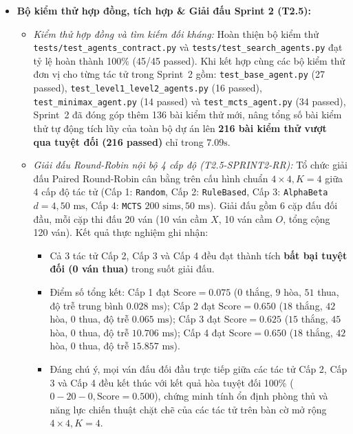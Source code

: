 \documentclass[a4paper,12pt]{report}
\begin{document}
\begin{itemize}
\begin{itemize}
    \end{itemize}
    \item \textbf{Bộ kiểm thử hợp đồng, tích hợp \& Giải đấu Sprint 2 (T2.5):}
    \begin{itemize}
        \item \textit{Kiểm thử hợp đồng và tìm kiếm đối kháng:} Hoàn thiện bộ kiểm thử \texttt{tests/\allowbreak test\_\allowbreak agents\_\allowbreak contract.py} và \texttt{tests/\allowbreak test\_\allowbreak search\_\allowbreak agents.py} đạt tỷ lệ hoàn thành 100\% (45/45 passed). Khi kết hợp cùng các bộ kiểm thử đơn vị cho từng tác tử trong Sprint~2 gồm: \texttt{test\_\allowbreak base\_\allowbreak agent.py} (27 passed), \texttt{test\_\allowbreak level1\_\allowbreak level2\_\allowbreak agents.py} (16 passed), \texttt{test\_\allowbreak minimax\_\allowbreak agent.py} (14 passed) và \texttt{test\_\allowbreak mcts\_\allowbreak agent.py} (34 passed), Sprint~2 đã đóng góp thêm 136 bài kiểm thử mới, nâng tổng số bài kiểm thử tự động tích lũy của toàn bộ dự án lên \textbf{216 bài kiểm thử vượt qua tuyệt đối (216 passed)} chỉ trong $7.09\text{s}$.
        \item \textit{Giải đấu Round-Robin nội bộ 4 cấp độ (T2.5-SPRINT2-RR):} Tổ chức giải đấu Paired Round-Robin cân bằng trên cấu hình chuẩn $4 \times 4, K=4$ giữa 4 cấp độ tác tử (Cấp 1: \texttt{Random}, Cấp 2: \texttt{RuleBased}, Cấp 3: \texttt{AlphaBeta} $d=4, 50\text{ ms}$, Cấp 4: \texttt{MCTS} $200\text{ sims}, 50\text{ ms}$). Giải đấu gồm 6 cặp đấu đối đầu, mỗi cặp thi đấu 20 ván (10 ván cầm $X$, 10 ván cầm $O$, tổng cộng 120 ván). Kết quả thực nghiệm ghi nhận:
        \begin{itemize}
            \item Cả 3 tác tử Cấp 2, Cấp 3 và Cấp 4 đều đạt thành tích \textbf{bất bại tuyệt đối (0 ván thua)} trong suốt giải đấu.
            \item Điểm số tổng kết: Cấp 1 đạt $\text{Score} = 0.075$ ($0$ thắng, $9$ hòa, $51$ thua, độ trễ trung bình $0.028\text{ ms}$); Cấp 2 đạt $\text{Score} = 0.650$ ($18$ thắng, $42$ hòa, $0$ thua, độ trễ $0.065\text{ ms}$); Cấp 3 đạt $\text{Score} = 0.625$ ($15$ thắng, $45$ hòa, $0$ thua, độ trễ $10.706\text{ ms}$); Cấp 4 đạt $\text{Score} = 0.650$ ($18$ thắng, $42$ hòa, $0$ thua, độ trễ $15.857\text{ ms}$).
            \item Đáng chú ý, mọi ván đấu đối đầu trực tiếp giữa các tác tử Cấp 2, Cấp 3 và Cấp 4 đều kết thúc với kết quả hòa tuyệt đối 100\% ($0-20-0, \text{Score} = 0.500$), chứng minh tính ổn định phòng thủ và năng lực chiến thuật chặt chẽ của các tác tử trên bàn cờ mở rộng $4 \times 4, K=4$.
        \end{itemize}
    \end{itemize}
\end{itemize}
\end{document}
